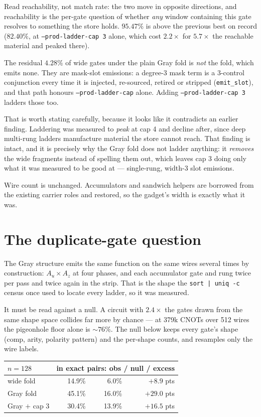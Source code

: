\documentclass[11pt]{article}
\newcommand{\code}[1]{\texttt{#1}}
\begin{document}
Read reachability, not match rate: the two move in opposite directions, and
reachability is the per-gate question of whether \emph{any} window containing
this gate resolves to something the store holds. $95.47\%$ is above the
previous best on record ($82.40\%$, at \code{--prod-ladder-cap 3} alone, which
cost $2.2\times$ for $5.7\times$ the reachable material and peaked there).

The residual $4.28\%$ of wide gates under the plain Gray fold is \emph{not} the
fold, which emits none. They are mask-slot emissions: a degree-3 mask term is a
3-control conjunction every time it is injected, re-sourced, retired or
stripped (\code{emit\_slot}), and that path honours \code{--prod-ladder-cap}
alone. Adding \code{--prod-ladder-cap 3} ladders those too.

That is worth stating carefully, because it looks like it contradicts an
earlier finding. Laddering was measured to \emph{peak} at cap 4 and decline
after, since deep multi-rung ladders manufacture material the store cannot
reach. That finding is intact, and it is precisely why the Gray fold does not
ladder anything: it \emph{removes} the wide fragments instead of spelling them
out, which leaves cap 3 doing only what it was measured to be good at ---
single-rung, width-3 slot emissions.

Wire count is unchanged. Accumulators and sandwich helpers are borrowed from
the existing carrier roles and restored, so the gadget's width is exactly what
it was.

\section{The duplicate-gate question}

The Gray structure emits the same function on the same wires several times by
construction: $A_u \times A_z$ at four phases, and each accumulator gate and
rung twice per pass and twice again in the strip. That is the shape the
\code{sort | uniq -c} census once used to locate every ladder, so it was
measured.

It must be read against a null. A circuit with $2.4\times$ the gates drawn from
the same shape space collides far more by chance --- at 379k CNOTs over 512
wires the pigeonhole floor alone is $\sim\!76\%$. The null below keeps every
gate's shape (comp, arity, polarity pattern) and the per-shape counts, and
resamples only the wire labels.

\begin{center}
\begin{tabular}{lrrr}
\toprule
$n=128$ & \multicolumn{3}{c}{in exact pairs: obs / null / excess} \\
\midrule
wide fold      & 14.9\% & 6.0\%  & $+8.9$ pts \\
Gray fold      & 45.1\% & 16.0\% & $+29.0$ pts \\
Gray $+$ cap 3 & 30.4\% & 13.9\% & $+16.5$ pts \\
\bottomrule
\end{tabular}
\end{center}
\end{document}
